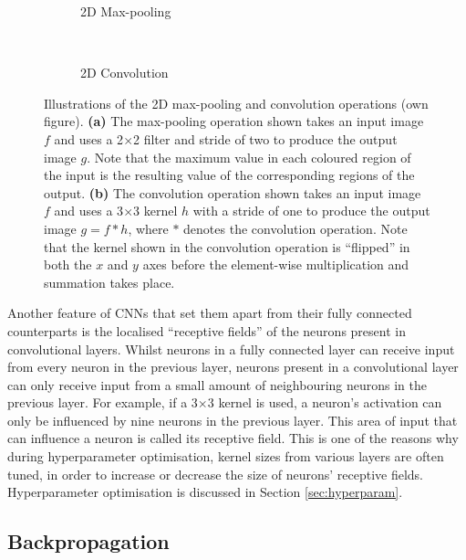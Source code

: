 \begin{figure}[t]
    \centering
    \begin{subfigure}[t]{0.43\textwidth}
        \centering
        
    \vspace*{1mm}
    \caption{2D Max-pooling}
    \end{subfigure}
    ~
    \begin{subfigure}[t]{0.55\textwidth}
        \centering
        
        \vspace*{1mm}
        \caption{2D Convolution}
    \end{subfigure}
    \caption{Illustrations of the 2D max-pooling and convolution operations (own figure). \textbf{(a)} The max-pooling operation shown takes an input image $f$ and uses a 2$\times$2 filter and stride of two to produce the output image $g$. Note that the maximum value in each coloured region of the input is the resulting value of the corresponding regions of the output. \textbf{(b)} The convolution operation shown takes an input image $f$ and uses a 3$\times$3 kernel $h$ with a stride of one to produce the output image $g=f\ast h$, where $\ast$ denotes the convolution operation. Note that the kernel shown in the convolution operation is ``flipped'' in both the $x$ and $y$ axes before the element-wise multiplication and summation takes place.}
    \label{fig:operations}
\end{figure}

Another feature of CNNs that set them apart from their fully connected counterparts is the localised ``receptive fields'' of the neurons present in convolutional layers. Whilst neurons in a fully connected layer can receive input from every neuron in the previous layer, neurons present in a convolutional layer can only receive input from a small amount of neighbouring neurons in the previous layer. For example, if a 3$\times$3 kernel is used, a neuron's activation can only be influenced by nine neurons in the previous layer. This area of input that can influence a neuron is called its receptive field. This is one of the reasons why during hyperparameter optimisation, kernel sizes from various layers are often tuned, in order to increase or decrease the size of neurons' receptive fields. Hyperparameter optimisation is discussed in Section \ref{sec:hyperparam}.

\subsection{Backpropagation}
\label{sec:backprop}

